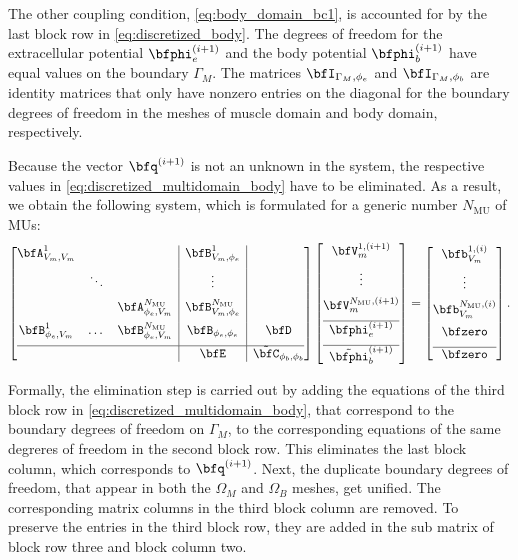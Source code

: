 The other coupling condition, \cref{eq:body_domain_bc1}, is accounted for by the last block row in \cref{eq:discretized_body}. The degrees of freedom for the extracellular potential $\bfphi_e^{(i+1)}$ and the body potential $\bfphi_b^{(i+1)}$ have equal values on the boundary $\Gamma_M$. The matrices $\bfI_{\Gamma_M,\phi_e}$ and $\bfI_{\Gamma_M,\phi_b}$ are identity matrices that only have nonzero entries on the diagonal for the boundary degrees of freedom in the meshes of muscle domain and body domain, respectively.

Because the vector $\bfq^{(i+1)}$ is not an unknown in the system, the respective values in \cref{eq:discretized_multidomain_body} have to be eliminated.
As a result, we obtain the following system, which is formulated for a generic number $N_\text{MU}$ of MUs:
%
\begin{align}\label{eq:discretized_multidomain_body2}
  \left[\begin{array}{@{}ccc|c|c@{}}
    \bfA_{V_m,V_m}^1 &&& \bfB_{V_m,\phi_e}^1 &\\[2mm]
    &\ddots&&\vdots&\\[2mm]
    &&\bfA_{\phi_e,V_m}^{N_\text{MU}} & \bfB_{V_m,\phi_e}^{N_\text{MU}}&\\[2mm]
    \bfB_{\phi_e,V_m}^1 & \dots & \bfB_{\phi_e,V_m}^{N_\text{MU}} & \bfB_{\phi_e,\phi_e} & \bfD \\[2mm] \hline
    &&&\bfE & \tilde{\bfC}_{\phi_b,\phi_b}
  \end{array}\right]
  \left[\begin{array}{@{}c@{}}
    \bfV_{m}^{1,(i+1)}  \\[2mm]
    \vdots\\[2mm]
    \bfV_{m}^{N_\text{MU},(i+1)}\\[2mm]\hline 
    \bfphi_{e}^{(i+1)} \\[2mm]\hline
    \tilde{\bfphi}_{b}^{(i+1)}
  \end{array}\right]
  = 
  \left[\begin{array}{@{}c@{}}
    \bfb_{V_m}^{1,(i)} \\[2mm]
    \vdots \\[2mm]
    \bfb_{V_m}^{N_\text{MU},(i)}\\[2mm]
    \bfzero\\[2mm]\hline
    \bfzero
  \end{array}\right].
\end{align}

Formally, the elimination step is carried out by adding the equations of the third block row in \cref{eq:discretized_multidomain_body}, that correspond to the boundary degrees of freedom on $\Gamma_M$, to the corresponding equations of the same degreres of freedom in the second block row. This eliminates the last block column, which corresponds to $\bfq^{(i+1)}$. Next, the duplicate boundary degrees of freedom, that appear in both the $\Omega_M$ and $\Omega_B$ meshes, get unified. The corresponding matrix columns in the third block column are removed. To preserve the entries in the third block row, they are added in the sub matrix of block row three and block column two.

